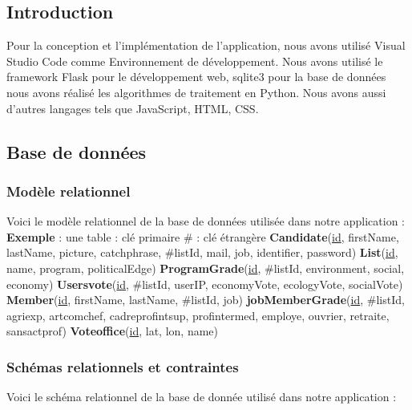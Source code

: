 \vskip 0.60cm
\subsection{Introduction}
\vskip 0.25cm
\noindent
Pour la conception et l'implémentation de l'application, nous avons utilisé Visual Studio Code comme Environnement de développement. Nous avons utilisé le framework Flask pour le développement web, sqlite3 pour la base de données nous avons réalisé les algorithmes de traitement en Python. Nous avons aussi d'autres langages tels que JavaScript, HTML, CSS.
\vskip 0.25cm
\subsection{Base de données}
\vskip 0.25cm
\subsubsection{Modèle relationnel}
Voici le modèle relationnel de la base de données utilisée dans notre application :
\newline
\newline
\textbf{Exemple} : une table
\newline
\underline{   } : clé primaire
\newline
\# : clé étrangère
\newline
\newline
\textbf{Candidate}(\underline{id}, firstName, lastName, picture, catchphrase, \#listId, mail, job, identifier, password)
\newline
\textbf{List}(\underline{id}, name, program, politicalEdge)
\newline
\textbf{ProgramGrade}(\underline{id}, \#listId, environment, social, economy)
\newline
\textbf{Users\textunderscore vote}(\underline{id}, \#listId, userIP, economyVote, ecologyVote, socialVote)
\newline
\textbf{Member}(\underline{id}, firstName, lastName, \#listId, job)
\newline
\textbf{jobMemberGrade}(\underline{id}, \#listId, agriexp, artcomchef, cadreprofintsup, profintermed, employe, ouvrier, retraite, sansactprof)
\newline
\textbf{Vote\textunderscore office}(\underline{id}, lat, lon, name)

\subsubsection{Schémas relationnels et contraintes}
Voici le schéma relationnel de la base de donnée utilisé dans notre application :
\newline\newline


